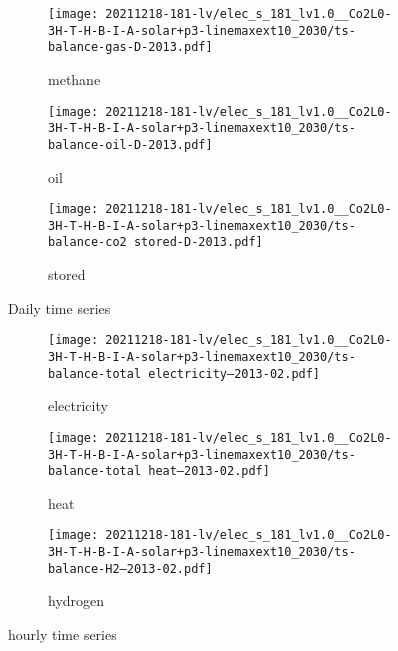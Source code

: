 \begin{figure}
    \centering
    \begin{subfigure}[t]{\textwidth}
        \centering
        \caption{methane}
        \texttt{[image: 20211218-181-lv/elec\_s\_181\_lv1.0\_\_Co2L0-3H-T-H-B-I-A-solar+p3-linemaxext10\_2030/ts-balance-gas-D-2013.pdf]}
    \end{subfigure}
    \begin{subfigure}[t]{\textwidth}
        \centering
        \caption{oil}
        \texttt{[image: 20211218-181-lv/elec\_s\_181\_lv1.0\_\_Co2L0-3H-T-H-B-I-A-solar+p3-linemaxext10\_2030/ts-balance-oil-D-2013.pdf]}
    \end{subfigure}
    \begin{subfigure}[t]{\textwidth}
        \centering
        \caption{stored \co}
        \texttt{[image: 20211218-181-lv/elec\_s\_181\_lv1.0\_\_Co2L0-3H-T-H-B-I-A-solar+p3-linemaxext10\_2030/ts-balance-co2 stored-D-2013.pdf]}
    \end{subfigure}
    \caption{Daily time series}
    \label{fig:output-ts-2}
\end{figure}


\begin{figure}
    \centering
    \begin{subfigure}[t]{\textwidth}
        \centering
        \caption{electricity}
        \texttt{[image: 20211218-181-lv/elec\_s\_181\_lv1.0\_\_Co2L0-3H-T-H-B-I-A-solar+p3-linemaxext10\_2030/ts-balance-total electricity--2013-02.pdf]}
    \end{subfigure}
    \begin{subfigure}[t]{\textwidth}
        \centering
        \caption{heat}
        \texttt{[image: 20211218-181-lv/elec\_s\_181\_lv1.0\_\_Co2L0-3H-T-H-B-I-A-solar+p3-linemaxext10\_2030/ts-balance-total heat--2013-02.pdf]}
    \end{subfigure}
    \begin{subfigure}[t]{\textwidth}
        \centering
        \caption{hydrogen}
        \texttt{[image: 20211218-181-lv/elec\_s\_181\_lv1.0\_\_Co2L0-3H-T-H-B-I-A-solar+p3-linemaxext10\_2030/ts-balance-H2--2013-02.pdf]}
    \end{subfigure}
    \caption{hourly time series}
    \label{fig:output-ts-3}
\end{figure}

